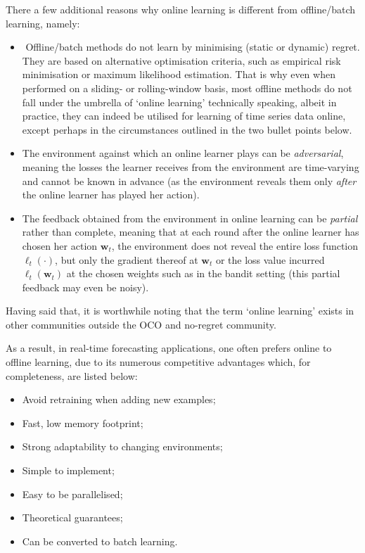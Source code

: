 \begin{mccorrection}
There a few additional reasons why online learning is different from offline/batch learning, namely:
\begin{itemize}
\item  Offline/batch methods do not learn by minimising (static or dynamic) regret. They are based on alternative optimisation criteria, such as empirical risk minimisation or maximum likelihood estimation. That is why even when performed on a sliding- or rolling-window basis, most offline methods do not fall under the umbrella of `online learning' technically speaking, albeit in practice, they can indeed be utilised for learning of time series data online, except perhaps in the circumstances outlined in the two bullet points below.
\item The environment against which an online learner plays can be \emph{adversarial}, meaning the losses the learner receives from the environment are time-varying and cannot be known in advance (as the environment reveals them only \emph{after} the online learner has played her action).
\item The feedback obtained from the environment in online learning can be \emph{partial} rather than complete, meaning that at each round after the online learner has chosen her action $\mathbf{w}_t$, the environment does not reveal the entire loss function $\ell_t(\cdot)$, but only the gradient thereof at $\mathbf{w}_t$ or the loss value incurred $\ell_t(\mathbf{w}_t)$ at the chosen weights such as in the bandit setting (this partial feedback may even be noisy). 
\end{itemize}
Having said that, it is worthwhile noting that the term `online learning' exists in other communities outside the OCO and no-regret community.%
\end{mccorrection}

As a result, in real-time forecasting applications, one often prefers online to offline learning, due to its numerous competitive advantages which, for completeness, are listed below:
\begin{itemize}
	\item Avoid retraining when adding new examples;
	\item Fast, low memory footprint;
	\item Strong adaptability to changing environments;
	\item Simple to implement;
	\item Easy to be parallelised;
	\item Theoretical guarantees;
	\item Can be converted to batch learning.
\end{itemize}


